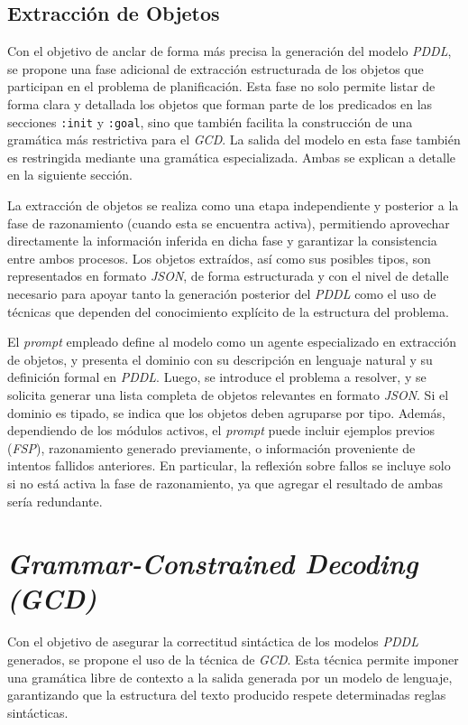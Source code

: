 \subsection{Extracción de Objetos}

Con el objetivo de anclar de forma más precisa la generación del modelo \textit{PDDL}, se propone una fase adicional de extracción estructurada de los objetos que participan en el problema de planificación. Esta fase no solo permite listar de forma clara y detallada los objetos que forman parte de los predicados en las secciones \texttt{:init} y \texttt{:goal}, sino que también facilita la construcción de una gramática más restrictiva para el \textit{GCD}. La salida del modelo en esta fase también es restringida mediante una gramática especializada. Ambas se explican a detalle en la siguiente sección.

La extracción de objetos se realiza como una etapa independiente y posterior a la fase de razonamiento (cuando esta se encuentra activa), permitiendo aprovechar directamente la información inferida en dicha fase y garantizar la consistencia entre ambos procesos. Los objetos extraídos, así como sus posibles tipos, son representados en formato \textit{JSON}, de forma estructurada y con el nivel de detalle necesario para apoyar tanto la generación posterior del \textit{PDDL} como el uso de técnicas que dependen del conocimiento explícito de la estructura del problema.

El \textit{prompt} empleado define al modelo como un agente especializado en extracción de objetos, y presenta el dominio con su descripción en lenguaje natural y su definición formal en \textit{PDDL}. Luego, se introduce el problema a resolver, y se solicita generar una lista completa de objetos relevantes en formato \textit{JSON}. Si el dominio es tipado, se indica que los objetos deben agruparse por tipo. Además, dependiendo de los módulos activos, el \textit{prompt} puede incluir ejemplos previos (\textit{FSP}), razonamiento generado previamente, o información proveniente de intentos fallidos anteriores. En particular, la reflexión sobre fallos se incluye solo si no está activa la fase de razonamiento, ya que agregar el resultado de ambas sería redundante.

\section{\textit{Grammar-Constrained Decoding (GCD)}}

Con el objetivo de asegurar la correctitud sintáctica de los modelos \textit{PDDL} generados, se propone el uso de la técnica de \textit{GCD}. Esta técnica permite imponer una gramática libre de contexto a la salida generada por un modelo de lenguaje, garantizando que la estructura del texto producido respete determinadas reglas sintácticas.

